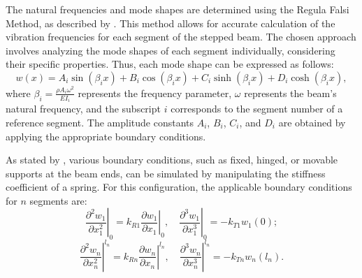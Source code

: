 The natural frequencies and mode shapes are determined using the Regula Falsi Method, as described by \textcite{koplow2006}. This method allows for accurate calculation of the vibration frequencies for each segment of the stepped beam. The chosen approach involves analyzing the mode shapes of each segment individually, considering their specific properties. Thus, each mode shape can be expressed as follows:
\begin{equation}   
    w(x) = A_i\sin(\beta_i x) + B_i\cos(\beta_i x) + C_i\sinh(\beta_i x) + D_i\cosh(\beta_i x),
\end{equation}
where $\beta_i = \displaystyle \frac{{\rho A_i\omega^2}}{{EI_i}}$ represents the frequency parameter, $\omega$ represents the beam's natural frequency, and the subscript $i$ corresponds to the segment number of a reference segment. The amplitude constants $A_i$, $B_i$, $C_i$, and $D_i$ are obtained by applying the appropriate boundary conditions.

As stated by \textcite{soares2016}, various boundary conditions, such as fixed, hinged, or movable supports at the beam ends, can be simulated by manipulating the stiffness coefficient of a spring. For this configuration, the applicable boundary conditions for $n$ segments are:
\begin{equation}
\left.\frac{\partial^2 w_1}{\partial x_1^2}\right|_0 = \left. k_{R1}\frac{\partial w_1}{\partial x_1} \right|_0 , \quad \left. \frac{\partial^3 w_1}{\partial x_1^3}\right|_0 = -k_{T1}w_1(0);
\end{equation}
\begin{equation}
\left. \frac{\partial^2 w_n}{\partial x_n^2}\right|^{l_n} = \left. k_{Rn}\frac{\partial w_n}{\partial x_n}\right|^{l_n}, \quad \left.\frac{\partial^3 w_n}{\partial x_n^3}\right|^{l_n} = -k_{Tn}w_n(l_n).
\end{equation}

